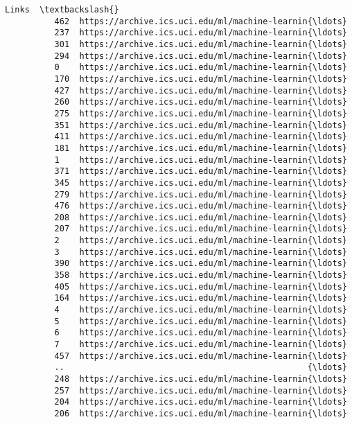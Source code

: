 \documentclass[11pt]{article}
\begin{document}
\begin{Verbatim}[commandchars=\\\{\}]
                                                           Links  \textbackslash{}
          462  https://archive.ics.uci.edu/ml/machine-learnin{\ldots}   
          237  https://archive.ics.uci.edu/ml/machine-learnin{\ldots}   
          301  https://archive.ics.uci.edu/ml/machine-learnin{\ldots}   
          294  https://archive.ics.uci.edu/ml/machine-learnin{\ldots}   
          0    https://archive.ics.uci.edu/ml/machine-learnin{\ldots}   
          170  https://archive.ics.uci.edu/ml/machine-learnin{\ldots}   
          427  https://archive.ics.uci.edu/ml/machine-learnin{\ldots}   
          260  https://archive.ics.uci.edu/ml/machine-learnin{\ldots}   
          275  https://archive.ics.uci.edu/ml/machine-learnin{\ldots}   
          351  https://archive.ics.uci.edu/ml/machine-learnin{\ldots}   
          411  https://archive.ics.uci.edu/ml/machine-learnin{\ldots}   
          181  https://archive.ics.uci.edu/ml/machine-learnin{\ldots}   
          1    https://archive.ics.uci.edu/ml/machine-learnin{\ldots}   
          371  https://archive.ics.uci.edu/ml/machine-learnin{\ldots}   
          345  https://archive.ics.uci.edu/ml/machine-learnin{\ldots}   
          279  https://archive.ics.uci.edu/ml/machine-learnin{\ldots}   
          476  https://archive.ics.uci.edu/ml/machine-learnin{\ldots}   
          208  https://archive.ics.uci.edu/ml/machine-learnin{\ldots}   
          207  https://archive.ics.uci.edu/ml/machine-learnin{\ldots}   
          2    https://archive.ics.uci.edu/ml/machine-learnin{\ldots}   
          3    https://archive.ics.uci.edu/ml/machine-learnin{\ldots}   
          390  https://archive.ics.uci.edu/ml/machine-learnin{\ldots}   
          358  https://archive.ics.uci.edu/ml/machine-learnin{\ldots}   
          405  https://archive.ics.uci.edu/ml/machine-learnin{\ldots}   
          164  https://archive.ics.uci.edu/ml/machine-learnin{\ldots}   
          4    https://archive.ics.uci.edu/ml/machine-learnin{\ldots}   
          5    https://archive.ics.uci.edu/ml/machine-learnin{\ldots}   
          6    https://archive.ics.uci.edu/ml/machine-learnin{\ldots}   
          7    https://archive.ics.uci.edu/ml/machine-learnin{\ldots}   
          457  https://archive.ics.uci.edu/ml/machine-learnin{\ldots}   
          ..                                                 {\ldots}   
          248  https://archive.ics.uci.edu/ml/machine-learnin{\ldots}   
          257  https://archive.ics.uci.edu/ml/machine-learnin{\ldots}   
          204  https://archive.ics.uci.edu/ml/machine-learnin{\ldots}   
          206  https://archive.ics.uci.edu/ml/machine-learnin{\ldots}   

\end{Verbatim}
\end{document}
